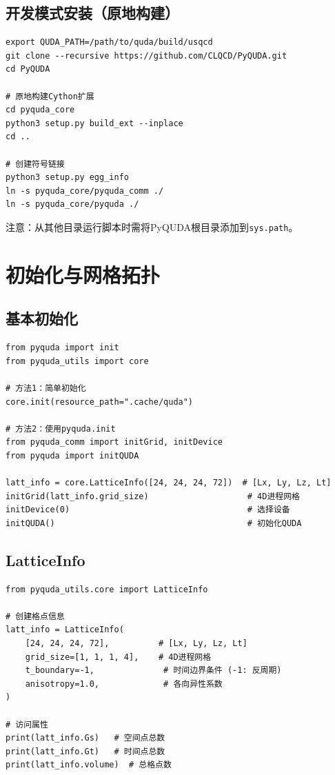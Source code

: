 \documentclass[12pt,a4paper]{ctexart}
\begin{document}
\subsection{开发模式安装（原地构建）}

\begin{lstlisting}[caption={原地构建（开发模式）}, label={lst:dev_install}]
export QUDA_PATH=/path/to/quda/build/usqcd
git clone --recursive https://github.com/CLQCD/PyQUDA.git
cd PyQUDA

# 原地构建Cython扩展
cd pyquda_core
python3 setup.py build_ext --inplace
cd ..

# 创建符号链接
python3 setup.py egg_info
ln -s pyquda_core/pyquda_comm ./
ln -s pyquda_core/pyquda ./
\end{lstlisting}

注意：从其他目录运行脚本时需将PyQUDA根目录添加到\texttt{sys.path}。

\section{初始化与网格拓扑}

\subsection{基本初始化}

\begin{lstlisting}[caption={PyQUDA初始化}, label={lst:init}]
from pyquda import init
from pyquda_utils import core

# 方法1：简单初始化
core.init(resource_path=".cache/quda")

# 方法2：使用pyquda.init
from pyquda_comm import initGrid, initDevice
from pyquda import initQUDA

latt_info = core.LatticeInfo([24, 24, 24, 72])  # [Lx, Ly, Lz, Lt]
initGrid(latt_info.grid_size)                    # 4D进程网格
initDevice(0)                                    # 选择设备
initQUDA()                                       # 初始化QUDA
\end{lstlisting}

\subsection{LatticeInfo}

\begin{lstlisting}[caption={格点信息对象}, label={lst:lattice_info}]
from pyquda_utils.core import LatticeInfo

# 创建格点信息
latt_info = LatticeInfo(
    [24, 24, 24, 72],          # [Lx, Ly, Lz, Lt]
    grid_size=[1, 1, 1, 4],    # 4D进程网格
    t_boundary=-1,              # 时间边界条件 (-1: 反周期)
    anisotropy=1.0,             # 各向异性系数
)

# 访问属性
print(latt_info.Gs)   # 空间点总数
print(latt_info.Gt)   # 时间点总数
print(latt_info.volume)  # 总格点数
\end{lstlisting}
\end{document}

